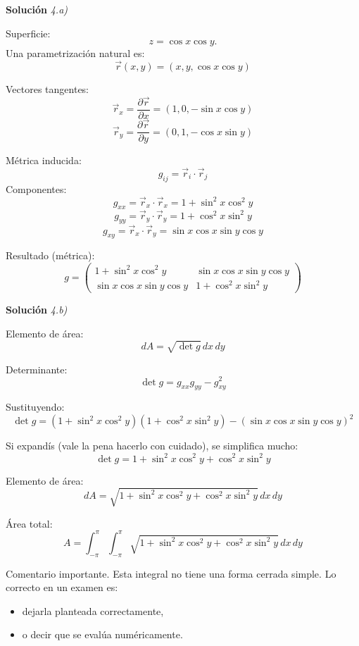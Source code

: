 \documentclass[11pt,spanish]{article}
\begin{document}
\vspace{0.5cm}
{\bf Soluci\'on }{\em 4.a)}
\vspace{0.5cm}


Superficie:
$$
z = \cos x \cos y.
$$
Una parametrización natural es:
$$
\vec r(x,y) = (x, y, \cos x \cos y)
$$

Vectores tangentes:
$$
\vec r_x = \frac{\partial \vec r}{\partial x} = (1,0,-\sin x \cos y)
$$
$$
\vec r_y = \frac{\partial \vec r}{\partial y} = (0,1,-\cos x \sin y)
$$

Métrica inducida:
$$
g_{ij} = \vec r_i \cdot \vec r_j
$$
Componentes:
$$
g_{xx} = \vec r_x \cdot \vec r_x = 1 + \sin^2 x \cos^2 y
$$
$$
g_{yy} = \vec r_y \cdot \vec r_y = 1 + \cos^2 x \sin^2 y
$$
$$
g_{xy} = \vec r_x \cdot \vec r_y = \sin x \cos x \sin y \cos y
$$

Resultado (métrica):
$$
\boxed{
g =
\begin{pmatrix}
1 + \sin^2 x \cos^2 y & \sin x \cos x \sin y \cos y \\
\sin x \cos x \sin y \cos y & 1 + \cos^2 x \sin^2 y
\end{pmatrix}
}
$$

\vspace{0.5cm}
{\bf Soluci\'on }{\em 4.b)}
\vspace{0.5cm}

Elemento de área:
$$
dA = \sqrt{\det g}\, dx\,dy
$$

Determinante:
$$
\det g = g_{xx}g_{yy} - g_{xy}^2
$$

Sustituyendo:
$$
\det g =
(1 + \sin^2 x \cos^2 y)(1 + \cos^2 x \sin^2 y)
-
(\sin x \cos x \sin y \cos y)^2
$$

Si expandís (vale la pena hacerlo con cuidado), se simplifica mucho:
$$
\det g = 1 + \sin^2 x \cos^2 y + \cos^2 x \sin^2 y
$$

Elemento de área:
$$
\boxed{
dA = \sqrt{1 + \sin^2 x \cos^2 y + \cos^2 x \sin^2 y}\, dx\,dy
}
$$

Área total:
$$
A = \int_{-\pi}^{\pi} \int_{-\pi}^{\pi}
\sqrt{1 + \sin^2 x \cos^2 y + \cos^2 x \sin^2 y}\, dx\,dy
$$

Comentario importante.
Esta integral no tiene una forma cerrada simple.
Lo correcto en un examen es:
\begin{itemize}
\item dejarla planteada correctamente, 
\item o decir que se evalúa numéricamente.
\end{itemize}
\end{document}
